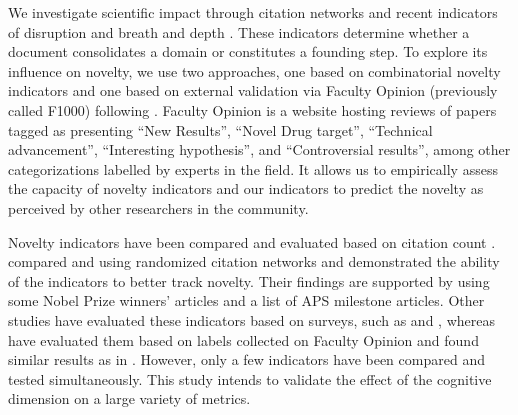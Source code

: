         We investigate scientific impact through citation networks and recent indicators of disruption and breath and depth \cite{wu2019large,wu_wu_2019,bu2019multi,bornmann1911disruption}. These indicators determine whether a document consolidates a domain or constitutes a founding step. To explore its influence on novelty, we use two approaches, one based on combinatorial novelty indicators \citep{uzzi2013atypical,lee2015creativity,foster2015tradition,wang2017bias,shibayama2021measuring} and one based on external validation via Faculty Opinion (previously called F1000) following \cite{bornmann2019do}. Faculty Opinion is a website hosting reviews of papers tagged as presenting ``New Results'', ``Novel Drug target'', ``Technical advancement'', ``Interesting hypothesis'', and ``Controversial results'', among other categorizations labelled by experts in the field. It allows us to empirically assess the capacity of novelty indicators and our indicators to predict the novelty as perceived by other researchers in the community. 
        
        Novelty indicators have been compared and evaluated based on citation count \citep{uzzi2013atypical, lee2015creativity, foster2015tradition, wang2017bias}. \cite{fontana2020new} compared \cite{wang2017bias} and \cite{uzzi2013atypical,lee2015creativity} using randomized citation networks and demonstrated the ability of the \cite{uzzi2013atypical,lee2015creativity} indicators to better track novelty. Their findings are supported by using some Nobel Prize winners' articles and a list of APS milestone articles. Other studies have evaluated these indicators based on surveys, such as \cite{shibayama2021measuring} and \cite{matsumoto2021introducing}, whereas \cite{bornmann2019do} have evaluated them based on labels collected on Faculty Opinion and found similar results as in \cite{fontana2020new}. However, only a few indicators have been compared and tested simultaneously. This study intends to validate the effect of the cognitive dimension on a large variety of metrics. %

